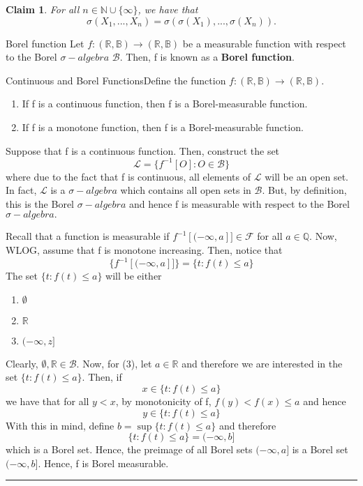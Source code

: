 \documentclass[twoside]{article}
\newtheorem{claim}[theorem]{Claim}
\newenvironment{proof}{{\bf Proof:}}{\hfill\rule{2mm}{2mm}}
\newcommand{\sigmalgebra}{\mathcal{F}}
\newcommand{\borelsigmaalgebra}{\mathcal{B}}
\newcommand{\sa}{\sigma-algebra}
\begin{document}
\begin{claim}For all $n \in \mathbb{N} \cup \{\infty\}$, we have that 
$$
\sigma(X_1,...,X_n) = \sigma(\sigma(X_1),...,\sigma(X_n)).
$$
\end{claim}


\begin{definition_exam}{Borel function}{} Let $f: (\mathbb{R},\mathbb{B}) \rightarrow (\mathbb{R},\mathbb{B})$ be a measurable function with respect to the Borel $\sa$ $\borelsigmaalgebra$. Then, f is known as a \textbf{Borel function}.
\end{definition_exam}

\begin{proposition_exam}{Continuous and Borel Functions}{}Define the function $f: (\mathbb{R},\mathbb{B}) \rightarrow (\mathbb{R},\mathbb{B}).$

\begin{enumerate}
\item If f is a continuous function, then f is a Borel-measurable function.
\item If f is a monotone function, then f is a Borel-measurable function.
\end{enumerate}
\end{proposition_exam}
\begin{proof} Suppose that f is a continuous function. Then, construct the set 
$$
\mathcal{L} = \{f^{-1}[O]: O \in \borelsigmaalgebra\}
$$
where due to the fact that f is continuous, all elements of $\mathcal{L}$ will be an open set. In fact, $\mathcal{L}$ is a $\sa$ which contains all open sets in $\borelsigmaalgebra.$ But, by definition, this is the Borel $\sa$ and hence f is measurable with respect to the Borel $\sa.$
\newline 

Recall that a function is measurable if $f^{-1}[(-\infty,a]] \in \sigmalgebra$ for all $a \in \mathbb{Q}.$ Now, WLOG, assume that f is monotone increasing. Then, notice that 
$$
\{f^{-1}[(-\infty,a]]\} = \{t: f(t) \leq a\}
$$
The set $\{t: f(t) \leq a\}$ will be either 
\begin{enumerate}
\item $\emptyset$
\item $\mathbb{R}$
\item $(-\infty, z]$
\end{enumerate}
Clearly, $\emptyset, \mathbb{R} \in \borelsigmaalgebra.$ Now, for (3), let $a \in \mathbb{R}$ and therefore we are interested in the set $\{t: f(t) \leq a\}.$ Then, if 
$$
x \in \{t: f(t) \leq a\}
$$
we have that for all $y < x$, by monotonicity of f, $f(y) < f(x) \leq a$ and hence 
$$
y \in \{t: f(t) \leq a\}
$$
With this in mind, define $b = \sup\{t: f(t) \leq a\}$ and therefore 
$$
\{t: f(t) \leq a\} = (-\infty, b]
$$
which is a Borel set. Hence, the preimage of all Borel sets $(-\infty, a]$ is a Borel set $(-\infty, b].$ Hence, f is Borel measurable.
\end{proof}
\end{document}
